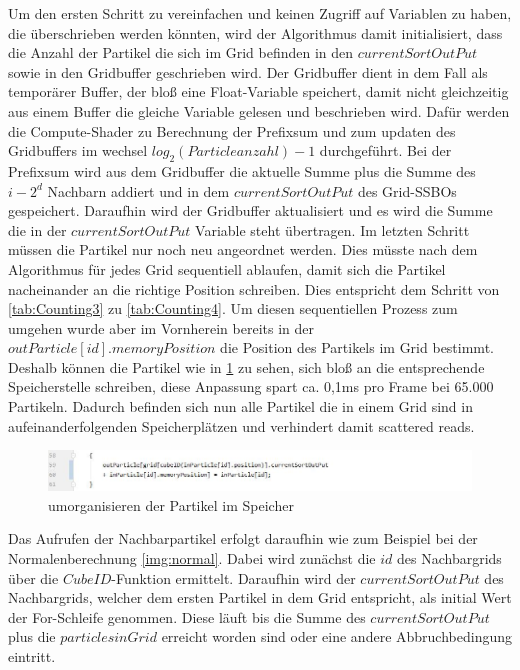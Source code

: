 \documentclass[intern,palatino]{cgBA}
\begin{document}
Um den ersten Schritt zu vereinfachen und keinen Zugriff auf Variablen zu haben, die überschrieben werden könnten, wird der Algorithmus damit initialisiert, dass die Anzahl der Partikel die sich im Grid befinden in den $currentSortOutPut$ sowie in den Gridbuffer geschrieben wird.
\newline
Der Gridbuffer dient in dem Fall als temporärer Buffer, der bloß eine Float-Variable speichert, damit nicht gleichzeitig aus einem Buffer die gleiche Variable gelesen und beschrieben wird.
Dafür werden die Compute-Shader zu Berechnung der Prefixsum und zum updaten des Gridbuffers im wechsel $log_2(Particleanzahl)-1$ durchgeführt. Bei der Prefixsum wird aus dem Gridbuffer die aktuelle Summe plus die Summe des $i - 2^d$ Nachbarn addiert und in dem $currentSortOutPut$ des Grid-SSBOs gespeichert. Daraufhin wird der Gridbuffer aktualisiert und es wird die Summe die in der $currentSortOutPut$ Variable steht übertragen.
\newline
Im letzten Schritt müssen die Partikel nur noch neu angeordnet werden. Dies müsste nach dem Algorithmus für jedes Grid sequentiell ablaufen, damit sich die Partikel nacheinander an die richtige Position schreiben. Dies entspricht dem Schritt von \ref{tab:Counting3} zu \ref{tab:Counting4}.
\newline
Um diesen sequentiellen Prozess zum umgehen wurde aber im Vornherein bereits in der $outParticle[id].memoryPosition$ die Position des Partikels im Grid bestimmt. Deshalb können die Partikel wie in \ref{img:rearrange} zu sehen, sich bloß an die entsprechende Speicherstelle schreiben, diese Anpassung spart ca. 0,1ms pro Frame bei 65.000 Partikeln. Dadurch befinden sich nun alle Partikel die in einem Grid sind in aufeinanderfolgenden Speicherplätzen und verhindert damit scattered reads.

\begin{figure}[H]
	\centering
	\includegraphics[width=1.3\columnwidth]{Bilder/rearrange.jpg}
	\caption{umorganisieren der Partikel im Speicher}
	\label{img:rearrange}
\end{figure}

Das Aufrufen der Nachbarpartikel erfolgt daraufhin wie zum Beispiel bei der Normalenberechnung \ref{img:normal}. Dabei wird zunächst die $id$ des Nachbargrids über die $CubeID$-Funktion ermittelt. Daraufhin wird der $currentSortOutPut$ des Nachbargrids, welcher dem ersten Partikel in dem Grid entspricht, als initial Wert der For-Schleife genommen. Diese läuft bis die Summe des $currentSortOutPut$ plus die $particlesinGrid$ erreicht worden sind oder eine andere Abbruchbedingung eintritt.
\end{document}
